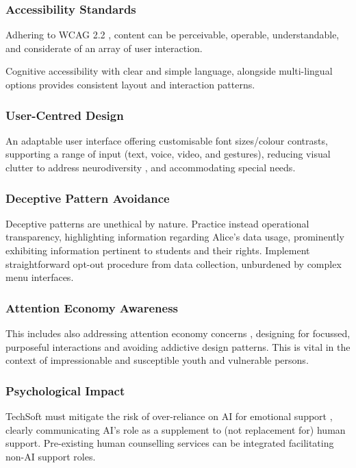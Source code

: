 \documentclass[14pt,a4paper]{article}
\begin{document}
\begin{multicols}{2}
\subsubsection{Accessibility Standards}
Adhering to WCAG 2.2 \textit{\parencite{W3C2024}}, content can be perceivable, operable, understandable, and considerate of an array of user interaction.

Cognitive accessibility \textit{\parencite[pp. 1-10]{Yesilada2024}} with clear and simple language, alongside multi-lingual options \textit{\parencite[pp. 50-100]{AnastasiouSchaler2024}} provides consistent layout and interaction patterns.

\subsubsection{User-Centred Design}
An adaptable user interface \textit{\parencite[pp. 20-50]{HarperYesilada2024}} offering customisable font sizes/colour contrasts, supporting a range of input (text, voice, video, and gestures), reducing visual clutter to address neurodiversity \textit{\parencite[pp. 30-60]{Armstrong2024}}, and accommodating special needs.

\subsubsection{Deceptive Pattern Avoidance}
Deceptive patterns \textit{\parencite{Brignull2023}} are unethical by nature.
Practice instead operational transparency, highlighting information regarding Alice's data usage, prominently exhibiting information pertinent to students and their rights. Implement straightforward opt-out procedure from data collection, unburdened by complex menu interfaces.

\subsubsection{Attention Economy Awareness}
This includes also addressing attention economy concerns \textit{\parencite[pp. 10-30]{Williams2024}}, designing for focussed, purposeful interactions and avoiding addictive design patterns.
This is vital in the context of impressionable and susceptible youth and vulnerable persons.

\subsubsection{Psychological Impact}
TechSoft must mitigate the risk of over-reliance on AI for emotional support \textit{\parencite[p. 746]{Miner2022}}, clearly communicating AI's role as a supplement to (not replacement for) human support.
Pre-existing human counselling services can be integrated facilitating non-AI support roles.


\end{multicols}
\end{document}

